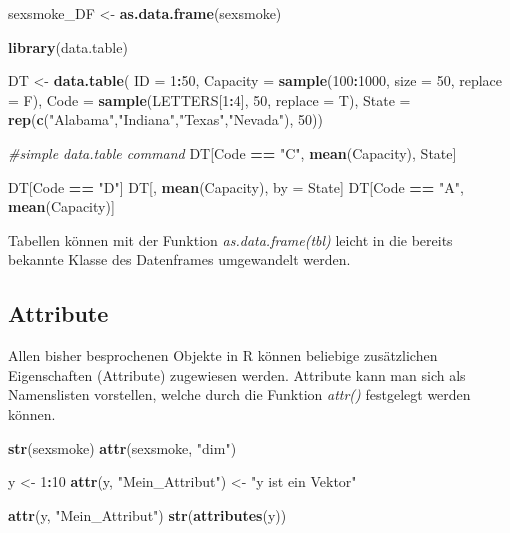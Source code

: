 \documentclass[]{article}
\newenvironment{Shaded}{\begin{snugshade}}{\end{snugshade}}
\newcommand{\KeywordTok}[1]{\textcolor[rgb]{0.13,0.29,0.53}{\textbf{#1}}}
\newcommand{\DataTypeTok}[1]{\textcolor[rgb]{0.13,0.29,0.53}{#1}}
\newcommand{\DecValTok}[1]{\textcolor[rgb]{0.00,0.00,0.81}{#1}}
\newcommand{\StringTok}[1]{\textcolor[rgb]{0.31,0.60,0.02}{#1}}
\newcommand{\CommentTok}[1]{\textcolor[rgb]{0.56,0.35,0.01}{\textit{#1}}}
\newcommand{\OperatorTok}[1]{\textcolor[rgb]{0.81,0.36,0.00}{\textbf{#1}}}
\newcommand{\NormalTok}[1]{#1}
\begin{document}
\begin{Shaded}
\begin{Highlighting}[]
\NormalTok{    sexsmoke_DF        <-}\StringTok{ }\KeywordTok{as.data.frame}\NormalTok{(sexsmoke)}
    
    \KeywordTok{library}\NormalTok{(data.table)}
    
\NormalTok{    DT <-}\StringTok{ }\KeywordTok{data.table}\NormalTok{( }\DataTypeTok{ID =} \DecValTok{1}\OperatorTok{:}\DecValTok{50}\NormalTok{,}
                      \DataTypeTok{Capacity =} \KeywordTok{sample}\NormalTok{(}\DecValTok{100}\OperatorTok{:}\DecValTok{1000}\NormalTok{, }\DataTypeTok{size =} \DecValTok{50}\NormalTok{, }\DataTypeTok{replace =}\NormalTok{ F),}
                      \DataTypeTok{Code =} \KeywordTok{sample}\NormalTok{(LETTERS[}\DecValTok{1}\OperatorTok{:}\DecValTok{4}\NormalTok{], }\DecValTok{50}\NormalTok{, }\DataTypeTok{replace =}\NormalTok{ T),}
                      \DataTypeTok{State =} \KeywordTok{rep}\NormalTok{(}\KeywordTok{c}\NormalTok{(}\StringTok{"Alabama"}\NormalTok{,}\StringTok{"Indiana"}\NormalTok{,}\StringTok{"Texas"}\NormalTok{,}\StringTok{"Nevada"}\NormalTok{), }\DecValTok{50}\NormalTok{))}
    
    \CommentTok{#simple data.table command}
\NormalTok{    DT[Code }\OperatorTok{==}\StringTok{ "C"}\NormalTok{, }\KeywordTok{mean}\NormalTok{(Capacity), State]}
    
\NormalTok{    DT[Code }\OperatorTok{==}\StringTok{ "D"}\NormalTok{]}
\NormalTok{    DT[, }\KeywordTok{mean}\NormalTok{(Capacity), by =}\StringTok{ }\NormalTok{State]}
\NormalTok{    DT[Code }\OperatorTok{==}\StringTok{ "A"}\NormalTok{, }\KeywordTok{mean}\NormalTok{(Capacity)]}
\end{Highlighting}
\end{Shaded}

Tabellen können mit der Funktion \emph{as.data.frame(tbl)} leicht in die
bereits bekannte Klasse des Datenframes umgewandelt werden.

\subsection*{Attribute}\label{attribute}

Allen bisher besprochenen Objekte in R können beliebige zusätzlichen
Eigenschaften (Attribute) zugewiesen werden. Attribute kann man sich als
Namenslisten vorstellen, welche durch die Funktion \emph{attr()}
festgelegt werden können.

\begin{Shaded}
\begin{Highlighting}[]
    \KeywordTok{str}\NormalTok{(sexsmoke)}
    \KeywordTok{attr}\NormalTok{(sexsmoke, }\StringTok{"dim"}\NormalTok{)}
    
\NormalTok{    y <-}\StringTok{ }\DecValTok{1}\OperatorTok{:}\DecValTok{10}
    \KeywordTok{attr}\NormalTok{(y, }\StringTok{"Mein_Attribut"}\NormalTok{) <-}\StringTok{ "y ist ein Vektor"}
    
    \KeywordTok{attr}\NormalTok{(y, }\StringTok{"Mein_Attribut"}\NormalTok{)}
    \KeywordTok{str}\NormalTok{(}\KeywordTok{attributes}\NormalTok{(y))}
\end{Highlighting}
\end{Shaded}
\end{document}
